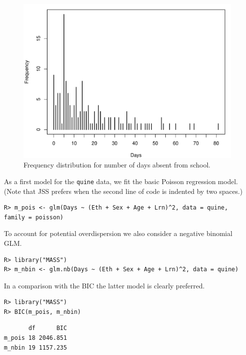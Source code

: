 \documentclass[
  article]{jss}
\begin{document}
\begin{figure}

{\centering 

\includegraphics{article-visualization.pdf}

}

\caption{\label{fig-quine}Frequency distribution for number of days
absent from school.}

\end{figure}

As a first model for the \texttt{quine} data, we fit the basic Poisson
regression model. (Note that JSS prefers when the second line of code is
indented by two spaces.)

\begin{verbatim}
R> m_pois <- glm(Days ~ (Eth + Sex + Age + Lrn)^2, data = quine, family = poisson)
\end{verbatim}

To account for potential overdispersion we also consider a negative
binomial GLM.

\begin{verbatim}
R> library("MASS")
R> m_nbin <- glm.nb(Days ~ (Eth + Sex + Age + Lrn)^2, data = quine)
\end{verbatim}

In a comparison with the BIC the latter model is clearly preferred.

\begin{verbatim}
R> library("MASS")
R> BIC(m_pois, m_nbin)
\end{verbatim}

\begin{verbatim}
       df      BIC
m_pois 18 2046.851
m_nbin 19 1157.235
\end{verbatim}
\end{document}
